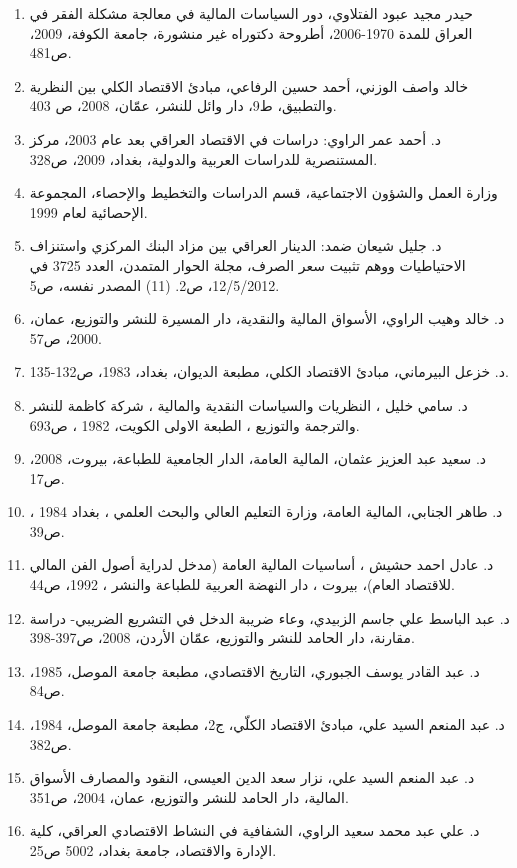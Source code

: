 \documentclass[10pt,a4paper]{report}
\begin{document}
\begin{enumerate}
	: \textit{www.islamfin.org-forum.net/p.1}.
	\item حيدر مجيد عبود الفتلاوي، دور السياسات المالية في معالجة مشكلة الفقر في العراق للمدة 1970-2006، أطروحة دكتوراه غير منشورة، جامعة الكوفة، 2009، ص481.
	\item خالد واصف الوزني، أحمد حسين الرفاعي، مبادئ الاقتصاد الكلي بين النظرية والتطبيق، ط9، دار وائل للنشر، عمّان، 2008، ص 403.
	\item د. أحمد عمر الراوي: دراسات في الاقتصاد العراقي بعد عام 2003، مركز المستنصرية للدراسات العربية والدولية، بغداد، 2009، ص328. 
	\item وزارة العمل والشؤون الاجتماعية، قسم الدراسات والتخطيط والإحصاء، المجموعة الإحصائية لعام 1999.
	\item د. جليل شيعان ضمد: الدينار العراقي بين مزاد البنك المركزي واستنزاف الاحتياطيات ووهم تثبيت سعر الصرف، مجلة الحوار المتمدن، العدد 3725 في 12/5/2012، ص2. (11) المصدر نفسه، ص5.
	\item د. خالد وهيب الراوي، الأسواق المالية والنقدية، دار المسيرة للنشر والتوزيع، عمان، 2000، ص57.
	\item د. خزعل البيرماني، مبادئ الاقتصاد الكلي، مطبعة الديوان، بغداد، 1983، ص132-135.
	    \item د. سامي خليل ، النظريات والسياسات النقدية والمالية ، شركة كاظمة للنشر والترجمة والتوزيع ، الطبعة الاولى الكويت، 1982 ، ص693.
	\item د. سعيد عبد العزيز عثمان، المالية العامة، الدار الجامعية للطباعة، بيروت، 2008، ص17.
	\item د. طاهر الجنابي، المالية العامة، وزارة التعليم العالي والبحث العلمي ، بغداد 1984 ، ص39.
	\item د. عادل احمد حشيش ، أساسيات المالية العامة (مدخل لدراية أصول الفن المالي للاقتصاد العام)، بيروت ، دار النهضة العربية للطباعة والنشر ، 1992، ص44.
	\item د. عبد الباسط علي جاسم الزبيدي، وعاء ضريبة الدخل في التشريع الضريبي- دراسة مقارنة، دار الحامد للنشر والتوزيع، عمّان الأردن، 2008، ص397-398.
	\item د. عبد القادر يوسف الجبوري، التاريخ الاقتصادي، مطبعة جامعة الموصل، 1985، ص84.
	\item د. عبد المنعم السيد علي، مبادئ الاقتصاد الكلّي، ج2، مطبعة جامعة الموصل، 1984، ص382.
	\item د. عبد المنعم السيد علي، نزار سعد الدين العيسى، النقود والمصارف الأسواق المالية، دار الحامد للنشر والتوزيع، عمان، 2004، ص351.
	\item د. علي عبد محمد سعيد الراوي، الشفافية في النشاط الاقتصادي العراقي، كلية الإدارة والاقتصاد، جامعة بغداد، 5002 ص25.

\end{enumerate}
\end{document}
